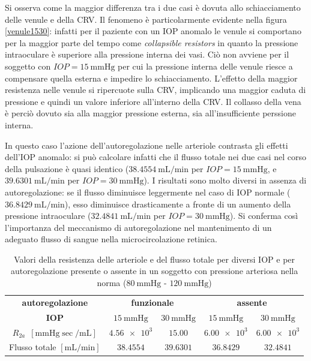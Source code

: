 \documentclass{article}
\begin{document}
Si osserva come la maggior differenza tra i due casi è dovuta allo schiacciamento delle venule e della CRV.
Il fenomeno è particolarmente evidente nella figura \ref{venule1530}: infatti per il paziente con un IOP anomalo le venule si comportano per la maggior parte del tempo come \textit{collapsible resistors} in quanto la pressione intraoculare è superiore alla pressione interna dei vasi.
Ciò non avviene per il soggetto con $IOP = \SI{15}{\mmHg}$ per cui la pressione interna delle venule riesce a compensare quella esterna e impedire lo schiacciamento.
L'effetto della maggior resistenza nelle venule si ripercuote sulla CRV, implicando una maggior caduta di pressione e quindi un valore inferiore all'interno della CRV.
Il collasso della vena è perciò dovuto sia alla maggior pressione esterna, sia all'insufficiente perssione interna.

In questo caso l'azione dell'autoregolazione nelle arteriole contrasta gli effetti dell'IOP anomalo: si può calcolare infatti che il flusso totale nei due casi nel corso della pulsazione è quasi identico ($\SI{38.4554}{\milli \liter \per \minute}$ per $IOP = \SI{15}{\mmHg}$, e $\SI{39.6301}{\milli \liter \per \minute}$ per $IOP = \SI{30}{\mmHg}$).
I risultati sono molto diversi in assenza di autoregolazione: se il flusso diminuisce leggermente nel caso di IOP normale ($\SI{36.8429}{\milli \liter \per \minute}$), esso diminuisce drasticamente a fronte di un aumento della pressione intraoculare ($\SI{32.4841}{\milli \liter \per \minute}$ per $IOP = \SI{30}{\mmHg}$).
Si conferma così l'importanza del meccanismo di autoregolazione nel mantenimento di un adeguato flusso di sangue nella microcircolazione retinica.

\begin{table}[h!]
\begin{tabular}{|c|cc|cc|}
\hline
 \textbf{autoregolazione}& \multicolumn{2}{c|}{\textbf{funzionale}} & \multicolumn{2}{c|}{\textbf{assente}} \\
 \textbf{IOP}& $\SI{15}{\mmHg}$ & $\SI{30}{\mmHg}$ & $\SI{15}{\mmHg}$ & $\SI{30}{\mmHg}$ \\
 \hline
$R_{2a}$\ $[\si{\mmHg \sec \per \milli \liter}]$ &$\num{4.56e3}$ &$\num{15.00}$ &$ \num{6.00e3}$&$ \num{6.00e3}$ \\
 Flusso totale $[\si{\milli \liter \per \minute}]$&$38.4554$&$39.6301$ &$36.8429$&$32.4841$\\
 \hline
\end{tabular}
\caption{Valori della resistenza delle arteriole e del flusso totale per diversi IOP e per autoregolazione presente o assente in un soggetto con pressione arteriosa nella norma ($\SI{80}{\mmHg}$ - $\SI{120}{\mmHg}$)}
\label{riassunto_res1}
\end{table}
\end{document}
